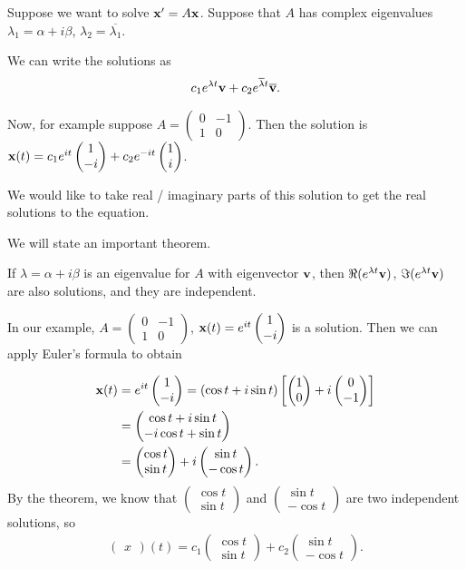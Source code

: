 \documentclass{article}
\newcommand{\ol}{\overline}
\newcommand{\mat}[1]{\begin{pmatrix}#1\end{pmatrix}}
\begin{document}
  Suppose we want to solve $\mathbf{x}' = A \mathbf{x}$.  Suppose that $A$ has complex eigenvalues  $\lambda_1 = \alpha + i \beta$, $\lambda_2 = \ol{\lambda_1}$.

  We can write the solutions as
  \begin{align*}
    c_1 e^{\lambda t} \mbf{v} + c_2 e^{\ol{\lambda} t} \ol{\mbf{v}}.
  \end{align*}

  Now, for example suppose $A = \mat{0 & -1 \\ 1 & 0}$.  Then the solution is $\mbf{x}(t) = c_1 e^{it} \mat{1 \\ -i} + c_2 e^{-it} \mat{1 \\ i}$.

  We would like to take real / imaginary parts of this solution to get the real solutions to the equation.

  We will state an important theorem.

  \begin{theorem}
    If $\lambda = \alpha + i \beta$ is an eigenvalue for $A$ with eigenvector $\mathbf{v}$, then $\Re (e^{\lambda t} \mathbf{v})$, $\Im(e^{\lambda t} \mathbf{v})$ are also solutions, and they are independent.
  \end{theorem}

  In our example, $A = \mat{0 & -1 \\ 1 & 0}$, $\mbf{x}(t) = e^{it} \mat{1 \\ -i}$ is a solution.  Then we can apply Euler's formula to obtain

  \begin{align*}
    \mbf{x}(t) &= e^{it} \mat{1 \\ -i} = (\cos t + i \sin t) \left[  \mat{1 \\ 0} + i \mat{0 \\ -1} \right] \\
    &= \mat{\cos t + i \sin t \\ -i \cos t + \sin t} \\
    &= \mat{\cos t \\ \sin t} + i \mat{\sin t \\ - \cos t}.
  \end{align*}
  By the theorem, we know that $\mat{\cos t \\ \sin t}$ and $\mat{\sin t \\ - \cos t}$ are two independent solutions, so 
  \begin{align*}
    \mat{x}(t) = c_1 \mat{\cos t \\ \sin t} + c_2 \mat{\sin t \\ - \cos t}.
  \end{align*}
\end{document}
